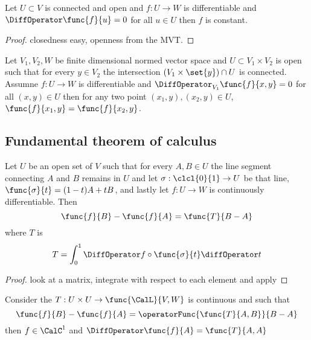 \begin{corollary}
    Let \(U \subset V\) is connected and open and \(f: U \to W\) is differentiable and \(\DiffOperator \func{f}{u} = 0\) for all \(u \in U\) then \(f\) is constant.
\end{corollary}

\begin{proof}
    closedness easy, openness from the MVT.
\end{proof}

\begin{corollary}
    Let \(V_1, V_2, W\) be finite dimensional normed vector space and \(U \subset V_1 \times V_2\) is open such that for every \(y \in V_2\) the intersection \((V_1 \times \set{y}) \cap U\) is connected. Assumne \(f : U \to W\) is differentiable and \(\DiffOperator_{V_1} \func{f}{x,y} = 0\) for all \((x,y) \in U\) then for any two point \((x_1,y), (x_2,y) \in U\),\(\func{f}{x_1,y} = \func{f}{x_2,y}\).
\end{corollary}

\subsection{Fundamental theorem of calculus}
\begin{theorem}
    Let \(U\) be an open set of \(V\) such that for every \(A,B \in U\) the line segment connecting \(A\) and \(B\) remains in \(U\) and let \(\sigma : \clcl{0}{1}\to U\) be that line, \(\func{\sigma}{t} = (1-t)A + tB\), and lastly let \(f: U \to W\) is continuously differentiable. Then
    \begin{equation*}
        \func{f}{B} - \func{f}{A} = \func{T}{B - A}
    \end{equation*}
    where \(T\) is
    \begin{equation*}
        T = \int_{0}^{1} \DiffOperator f \circ \func{\sigma}{t} \diffOperator t
    \end{equation*}
\end{theorem}

\begin{proof}
    look at a matrix, integrate with respect to each element and apply
\end{proof}

\begin{theorem}
    Consider the \(T: U \times U \to \func{\CalL}{V,W}\) is continuous and such that
    \begin{equation*}
        \func{f}{B} - \func{f}{A} = \operatorFunc{\func{T}{A,B}}{B-A}
    \end{equation*}
    then \(f \in \CalC^1\) and \(\DiffOperator \func{f}{A} = \func{T}{A,A}\)
\end{theorem}

